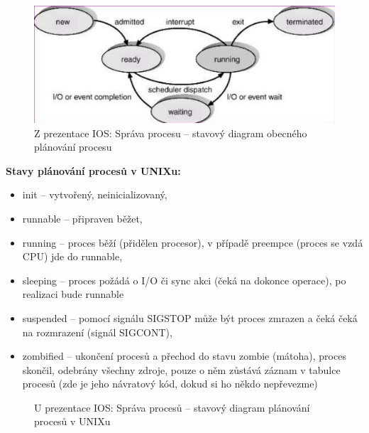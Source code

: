 \documentclass[a4paper, 11pt]{article}
\begin{document}
\begin{figure} [ht]
    \centering
    \includegraphics[width=\textwidth]{8.6_1.jpg}
    \caption{Z prezentace IOS: Správa procesu -- stavový diagram obecného plánování procesu}
\end{figure}

\newpage

\textbf{Stavy plánování procesů v UNIXu:}
\begin{itemize}
    \item init -- vytvořený, neinicializovaný,
    \item runnable -- připraven běžet,
    \item running -- proces běží (přidělen procesor), v případě preempce (proces se vzdá CPU) jde do runnable,
    \item sleeping -- proces požádá o I/O či sync akci (čeká na dokonce operace), po realizaci bude runnable
    \item suspended -- pomocí signálu SIGSTOP může být proces zmrazen a čeká čeká na rozmrazení (signál SIGCONT),
    \item zombified -- ukončení procesů a přechod do stavu zombie (mátoha), proces skončil, odebrány všechny zdroje, pouze o něm zůstává záznam v tabulce procesů (zde je jeho návratový kód, dokud si ho někdo nepřevezme)
\end{itemize}
 
\begin{figure} [ht]
    \centering
    \caption{U prezentace IOS: Správa procesů -- stavový diagram plánování procesů v UNIXu}
\end{figure}
 
\end{document}
